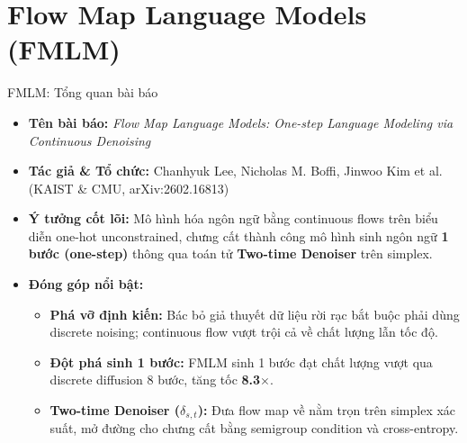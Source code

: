 
\section{Flow Map Language Models (FMLM)}

\begin{frame}{FMLM: Tổng quan bài báo}
    \begin{itemize}
        \item \textbf{Tên bài báo:} \textit{Flow Map Language Models: One-step Language Modeling via Continuous Denoising}
        \item \textbf{Tác giả \& Tổ chức:} Chanhyuk Lee, Nicholas M. Boffi, Jinwoo Kim et al. (KAIST \& CMU, arXiv:2602.16813)
        \item \textbf{Ý tưởng cốt lõi:} Mô hình hóa ngôn ngữ bằng continuous flows trên biểu diễn one-hot unconstrained, chưng cất thành công mô hình sinh ngôn ngữ \textbf{1 bước (one-step)} thông qua toán tử \textbf{Two-time Denoiser} trên simplex.
        \item \textbf{Đóng góp nổi bật:}
        \begin{itemize}
            \item \textbf{Phá vỡ định kiến:} Bác bỏ giả thuyết dữ liệu rời rạc bắt buộc phải dùng discrete noising; continuous flow vượt trội cả về chất lượng lẫn tốc độ.
            \item \textbf{Đột phá sinh 1 bước:} FMLM sinh 1 bước đạt chất lượng vượt qua discrete diffusion 8 bước, tăng tốc \textbf{8.3$\times$}.
            \item \textbf{Two-time Denoiser ($\delta_{s,t}$):} Đưa flow map về nằm trọn trên simplex xác suất, mở đường cho chưng cất bằng semigroup condition và cross-entropy.
        \end{itemize}
    \end{itemize}
\end{frame}

